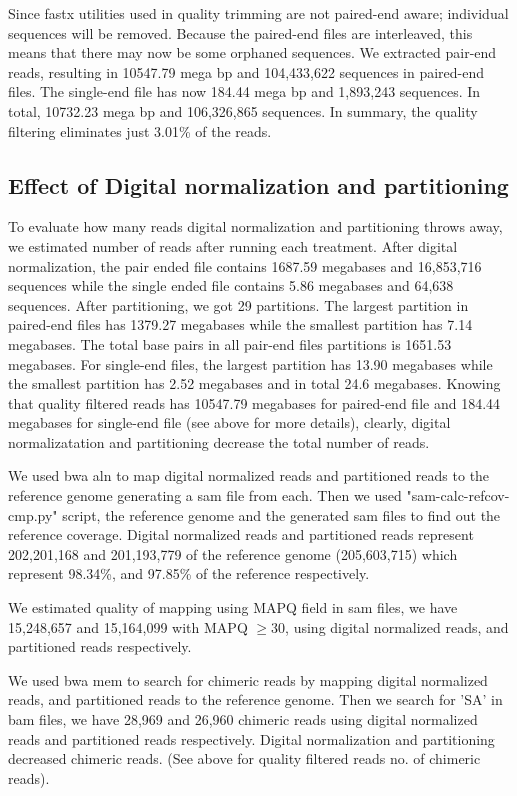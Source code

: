 Since fastx utilities used in quality trimming  are not paired-end aware;  individual sequences will be removed. Because the paired-end files are interleaved, this means that there may now be some orphaned sequences. We extracted pair-end reads, resulting in 10547.79 mega bp and 104,433,622 sequences in paired-end files. The single-end file has now 184.44 mega bp and 1,893,243 sequences. In total, 10732.23 mega bp and 106,326,865 sequences.
In summary, the quality filtering eliminates just 3.01\% of the reads. 




\subsection *{Effect of Digital normalization and partitioning} 
To evaluate how many reads digital normalization and partitioning throws away, we estimated number of reads after running each treatment. 
After digital normalization, the pair ended file contains 1687.59 megabases and 16,853,716 sequences  while the single ended file contains 5.86 megabases and 64,638 sequences. 
After partitioning, we got 29 partitions. The largest partition in paired-end files has 1379.27 megabases while the smallest partition has 7.14 megabases. The total base pairs in all pair-end files  partitions is 1651.53 megabases. 
For single-end files, the largest partition has 13.90 megabases while the smallest partition has 2.52 megabases and in total 24.6  megabases. 
Knowing that quality filtered reads has 10547.79 megabases for paired-end file and 184.44  megabases for single-end file (see above for more details), clearly, digital normalizatation and partitioning decrease the total number of reads.  


We used bwa aln \cite{bwa-mem} to map digital normalized reads and partitioned reads to the reference genome generating a sam file from each. Then we used  "sam-calc-refcov-cmp.py" script, the reference genome and the generated sam files to find out the reference coverage. Digital normalized reads and partitioned reads represent  202,201,168 and 201,193,779 of the reference genome (205,603,715)  which represent 98.34\%, and 97.85\%  of the reference respectively.


We estimated quality of mapping using MAPQ field in sam files, we have 15,248,657 and 15,164,099 with MAPQ $\geq 30$,  using  digital normalized reads, and partitioned reads respectively. 

We used bwa mem to search for chimeric reads by mapping digital normalized reads, and partitioned reads to the reference genome. Then we search for 'SA' in bam files, we have 28,969 and  26,960 chimeric reads using digital normalized reads and partitioned reads respectively. Digital normalization and partitioning decreased chimeric reads. (See above for quality filtered reads no. of chimeric reads). 



